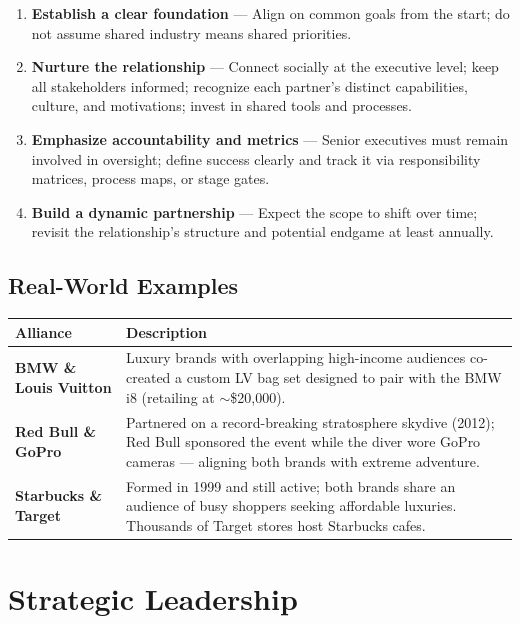 \documentclass[11pt, letterpaper]{article}
\begin{document}
\begin{enumerate}[leftmargin=*, label=\textbf{\arabic*.}]
  \item \textbf{Establish a clear foundation} --- Align on common goals from the start; do not assume shared industry means shared priorities.
  \item \textbf{Nurture the relationship} --- Connect socially at the executive level; keep all stakeholders informed; recognize each partner's distinct capabilities, culture, and motivations; invest in shared tools and processes.
  \item \textbf{Emphasize accountability and metrics} --- Senior executives must remain involved in oversight; define success clearly and track it via responsibility matrices, process maps, or stage gates.
  \item \textbf{Build a dynamic partnership} --- Expect the scope to shift over time; revisit the relationship's structure and potential endgame at least annually.
\end{enumerate}

\subsection{Real-World Examples}

\begin{center}
\begin{tabular}{>{\bfseries}p{3.5cm} p{9cm}}
\toprule
Alliance & Description \\
\midrule
BMW \& Louis Vuitton & Luxury brands with overlapping high-income audiences co-created a custom LV bag set designed to pair with the BMW i8 (retailing at $\sim$\$20,000). \\
\addlinespace
Red Bull \& GoPro & Partnered on a record-breaking stratosphere skydive (2012); Red Bull sponsored the event while the diver wore GoPro cameras --- aligning both brands with extreme adventure. \\
\addlinespace
Starbucks \& Target & Formed in 1999 and still active; both brands share an audience of busy shoppers seeking affordable luxuries. Thousands of Target stores host Starbucks cafes. \\
\bottomrule
\end{tabular}
\end{center}

\newpage

\section{Strategic Leadership}
\end{document}
